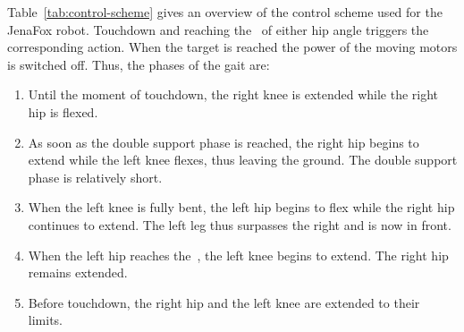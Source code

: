     Table~\ref{tab:control-scheme} gives an overview of the control scheme used for the JenaFox robot. Touchdown and reaching the~ of either hip angle triggers the corresponding action. When the target is reached the power of the moving motors is switched off. Thus, the phases of the gait are:

    \begin{enumerate}
        \item Until the moment of touchdown, the right knee is extended while the right hip is flexed.
        \item As soon as the double support phase is reached, the right hip begins to extend while the left knee flexes, thus leaving the ground. The double support phase is relatively short.
        \item When the left knee is fully bent, the left hip begins to flex while the right hip continues to extend. The left leg thus surpasses the right and is now in front.
        \item When the left hip reaches the~, the left knee begins to extend. The right hip remains extended.
        \item Before touchdown, the right hip and the left knee are extended to their limits.
    \end{enumerate}

